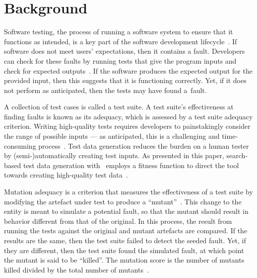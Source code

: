 \section{Background}\label{sec:background}


Software testing, the process of running a software system to ensure that it functions as intended, is a key part of the
software development lifecycle~\cite{Kapfhammer2004}. If software does not meet users' expectations, then it contains a
fault. Developers can check for these faults by running tests that give the program inputs and check for expected
outputs~\cite{Kapfhammer2010}. If the software produces the expected output for the provided input, then this suggests
that it is functioning correctly. Yet, if it does not perform as anticipated, then the tests may have found \mbox{a
fault}.


A collection of test cases is called a test suite. A test suite's effectiveness at finding faults is known as its
adequacy, which is assessed by a test suite adequacy criterion.  Writing high-quality tests requires developers to
painstakingly consider the range of possible inputs --- as anticipated, this is a challenging and time-consuming
process~\cite{Fraser2015}. Test data generation reduces the burden on a human tester by (semi-)automatically creating
test inputs. As presented in this paper, search-based test data generation with \sa~employs a fitness function to direct
the tool towards creating high-quality test data~\cite{STVR:STVR294}.



Mutation adequacy is a criterion that measures the effectiveness of a test suite by modifying the artefact under test to
produce a ``mutant''~\cite{Just2011a}. This change to the entity is meant to simulate a potential fault, so that the
mutant should result in behavior different from that of the original. In this process, the result from running the tests
against the original and mutant artefacts are compared. If the results are the same, then the test suite failed to
detect the seeded fault. Yet, if they are different, then the test suite found the simulated fault, at which point the
mutant is said to be ``killed''. The mutation score is the number of mutants killed divided by the total number of
mutants~\cite{Just2012b}.

